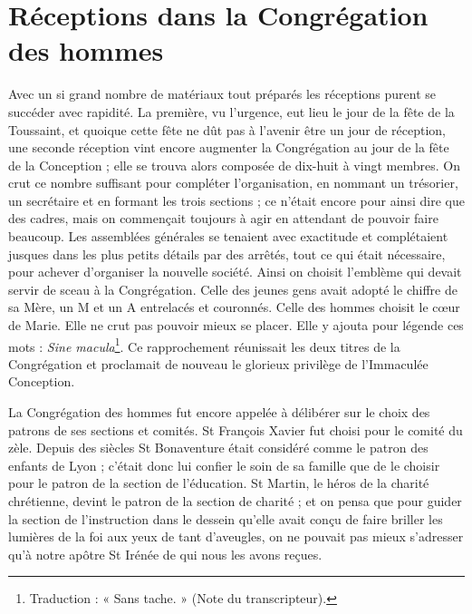 \section*{Réceptions dans la Congrégation des hommes}
Avec un si grand nombre de matériaux tout préparés les réceptions purent se succéder avec rapidité. La première, vu l'urgence, eut lieu le jour de la fête de la Toussaint, et quoique cette fête ne dût pas à l'avenir être un jour de réception, une
seconde réception vint encore augmenter la Congrégation au jour de la fête de la Conception ; elle se trouva alors composée de dix-huit à vingt membres. On crut ce nombre suffisant pour compléter l'organisation, en nommant un trésorier, un secrétaire et en formant les trois sections ; ce n'était encore pour ainsi dire que des cadres, mais on commençait toujours à agir en attendant de pouvoir faire beaucoup. Les assemblées générales se tenaient avec exactitude et complétaient jusques dans les plus petits détails par des arrêtés, tout ce qui était nécessaire, pour achever d'organiser la nouvelle société. Ainsi on choisit l'emblème qui devait servir de sceau à la Congrégation. Celle des jeunes gens avait adopté le chiffre de sa Mère, un M et un A entrelacés et couronnés. Celle des hommes choisit le cœur de Marie. Elle ne crut pas pouvoir mieux se placer. Elle y ajouta pour légende ces mots : \textit{Sine macula}\footnote{Traduction : « Sans tache. » (Note du transcripteur).}. Ce rapprochement réunissait les deux titres de la Congrégation et proclamait de nouveau le glorieux privilège de l'Immaculée Conception.

La Congrégation des hommes fut encore appelée à délibérer sur le choix des patrons de ses sections et comités. St François Xavier fut choisi pour le comité du zèle. Depuis des siècles St Bonaventure était considéré comme le patron des enfants de Lyon ; c'était donc lui confier le soin de sa famille que de le choisir pour le patron de la section de l'éducation. St Martin, le héros de la charité chrétienne, devint le patron de la section de charité ; et on pensa que pour guider la section de l'instruction dans le dessein qu'elle avait conçu de faire briller les lumières de la foi aux yeux de tant d'aveugles, on ne pouvait pas mieux s'adresser qu'à notre apôtre St Irénée de qui nous les avons reçues.

